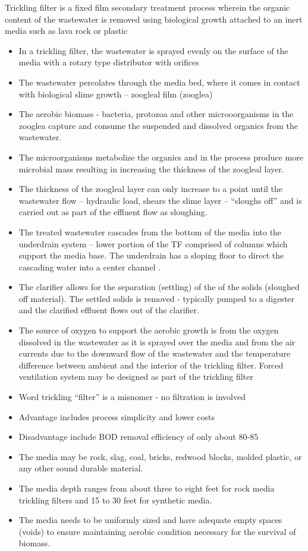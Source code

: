 Trickling filter is a fixed film secondary treatment process wherein the organic content of the wastewater is removed using biological growth attached to an inert media such as lava rock or plastic\\			
\begin{itemize}
\item In a trickling filter, the wastewater is sprayed evenly on the surface of the media with a rotary type distributor with orifices
\item The wastewater percolates through the media bed, where it comes in contact with biological slime growth – zoogleal film (zooglea)
\item The aerobic biomass - bacteria, protozoa and other microoorganisms in the zooglea capture and consume the suspended and dissolved organics from the wastewater.
\item The microorganisms metabolize the organics and in the process produce more microbial mass resulting in increasing the thickness of the zoogleal layer.
\item The thickness of the zoogleal layer can only increase to a point until the wastewater flow – hydraulic load, shears the slime layer – “sloughs off” and is carried out as part of the effluent flow as sloughing.
\item The treated wastewater cascades from the bottom of the media into the underdrain system – lower portion of the TF comprised of columns which support the media base.  The underdrain has a sloping floor to direct the cascading water into a center channel .
\item The clarifier allows for the separation (settling) of the  of the solids (sloughed off material).  The settled solids is removed - typically pumped to a digester and the clarified effluent flows out of the clarifier.
\item The source of oxygen to support the aerobic growth is from the oxygen dissolved in the wastewater as it is sprayed over the media and from the air currents due to the downward flow of the wastewater and the temperature difference between ambient and the interior of the trickling filter.  Forced ventilation system may be designed as part of the trickling filter

\item Word trickling “filter” is a misnomer - no filtration is involved
\item Advantage includes process simplicity and lower costs
\item Disadvantage include BOD removal efficiency of only about 80-85%
\item The media may be rock, slag, coal, bricks, redwood blocks, molded plastic, or any other sound durable material.
\item The media depth ranges from about three to eight feet for rock media trickling filters and 15 to 30 feet for synthetic media.
\item The media needs to be uniformly sized and have adequate empty spaces (voids) to ensure maintaining aerobic condition necessary for the survival of biomass.  


\end{itemize}

